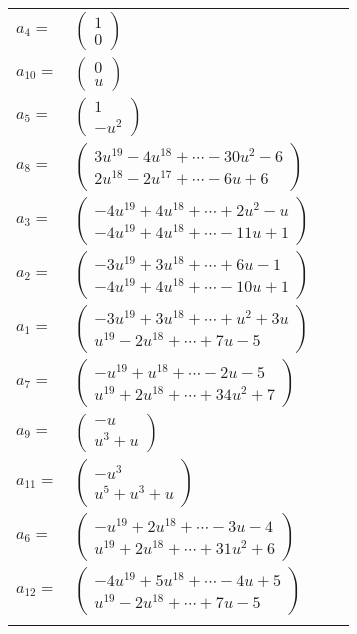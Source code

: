 \documentclass[1p]{elsarticle_modified}
\theoremstyle{definition}
\begin{document}
\begin{tabular}{m{7pt} m{180pt} m{7pt} m{180pt} }
\flushright $a_{4}=$&$\begin{pmatrix}1\\0\end{pmatrix}$ \\
\flushright $a_{10}=$&$\begin{pmatrix}0\\u\end{pmatrix}$ \\
\flushright $a_{5}=$&$\begin{pmatrix}1\\- u^2\end{pmatrix}$ \\
\flushright $a_{8}=$&$\begin{pmatrix}3 u^{19}-4 u^{18}+\cdots-30 u^2-6\\2 u^{18}-2 u^{17}+\cdots-6 u+6\end{pmatrix}$ \\
\flushright $a_{3}=$&$\begin{pmatrix}-4 u^{19}+4 u^{18}+\cdots+2 u^2- u\\-4 u^{19}+4 u^{18}+\cdots-11 u+1\end{pmatrix}$ \\
\flushright $a_{2}=$&$\begin{pmatrix}-3 u^{19}+3 u^{18}+\cdots+6 u-1\\-4 u^{19}+4 u^{18}+\cdots-10 u+1\end{pmatrix}$ \\
\flushright $a_{1}=$&$\begin{pmatrix}-3 u^{19}+3 u^{18}+\cdots+u^2+3 u\\u^{19}-2 u^{18}+\cdots+7 u-5\end{pmatrix}$ \\
\flushright $a_{7}=$&$\begin{pmatrix}- u^{19}+u^{18}+\cdots-2 u-5\\u^{19}+2 u^{18}+\cdots+34 u^2+7\end{pmatrix}$ \\
\flushright $a_{9}=$&$\begin{pmatrix}- u\\u^3+u\end{pmatrix}$ \\
\flushright $a_{11}=$&$\begin{pmatrix}- u^3\\u^5+u^3+u\end{pmatrix}$ \\
\flushright $a_{6}=$&$\begin{pmatrix}- u^{19}+2 u^{18}+\cdots-3 u-4\\u^{19}+2 u^{18}+\cdots+31 u^2+6\end{pmatrix}$ \\
\flushright $a_{12}=$&$\begin{pmatrix}-4 u^{19}+5 u^{18}+\cdots-4 u+5\\u^{19}-2 u^{18}+\cdots+7 u-5\end{pmatrix}$\\&\end{tabular}
\end{document}
